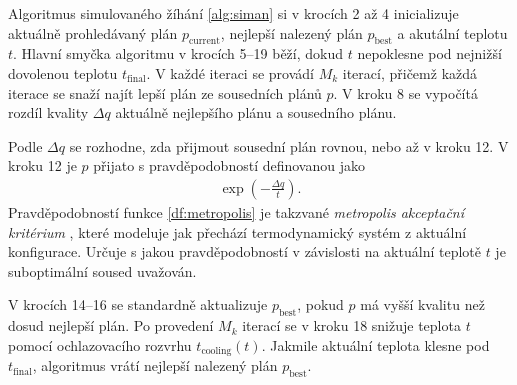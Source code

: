 Algoritmus simulovaného žíhání \ref{alg:siman} si v krocích 2 až 4 inicializuje aktuálně prohledávaný plán $p_{\text{current}}$, nejlepší nalezený plán $p_{\text{best}}$ a akutální teplotu $t$.
Hlavní smyčka algoritmu v krocích 5--19 běží, dokud $t$ nepoklesne pod nejnižší dovolenou teplotu $t_{\text{final}}$.
V každé iteraci se provádí $M_k$ iterací, přičemž každá iterace se snaží najít lepší plán ze sousedních plánů $p$.
V kroku 8 se vypočítá rozdíl kvality $\Delta q$ aktuálně nejlepšího plánu a sousedního plánu.

Podle $\Delta q$ se rozhodne, zda přijmout sousední plán rovnou, nebo až v kroku 12.
V kroku 12 je $p$ přijato s pravděpodobností definovanou jako
\begin{align}\label{df:metropolis}
  \exp\left(-\frac{\Delta q}{t}\right).
\end{align}
Pravděpodobností funkce \ref{df:metropolis} je takzvané \textit{metropolis akceptační kritérium} \cite{Metropolis}, které modeluje
jak přechází termodynamický systém z aktuální konfigurace.
Určuje s jakou pravděpodobností v závislosti na aktuální teplotě $t$ je suboptimální soused uvažován.

V krocích 14--16 se standardně aktualizuje $p_{\text{best}}$, pokud $p$ má vyšší kvalitu než dosud nejlepší plán.
Po provedení $M_k$ iterací se v kroku 18 snižuje teplota $t$ pomocí ochlazovacího rozvrhu $t_{\text{cooling}}(t)$.
Jakmile aktuální teplota klesne pod $t_{\text{final}}$, algoritmus vrátí nejlepší nalezený plán $p_{\text{best}}$.

